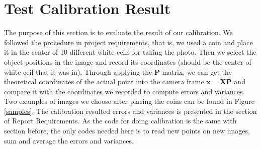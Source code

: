 \documentclass[conference]{IEEEtran}
\newcommand{\mat}[1]{\mathbf{#1}} %
\begin{document}
\section{Test Calibration Result}
The purpose of this section is to evaluate the result of our calibration. We followed the procedure in project requirements, that is, we used a coin and place it in the center of 10 different white ceils for taking the photo. Then we select the object positions in the image and record its coordinates (should be the center of white ceil that it was in). Through applying the $\mat{P}$ matrix, we can get the theoretical coordinates of the actual point into the camera frame $\mat{x} = \mat{X}\mat{P}$ and compare it with the coordinates we recorded to compute errors and variances. Two examples of images we choose after placing the coins can be found in Figure \ref{samples}. The calibration resulted errors and variances is presented in the section of Report Requirements. As the code for doing calibration is the same with section before, the only codes needed here is to read new points on new images, sum and average the errors and variances.
\begin{figure*}[!hbpt]
  \caption{Sample images we took for testing calibration}
  \label{samples} %
\end{figure*}
\end{document}

